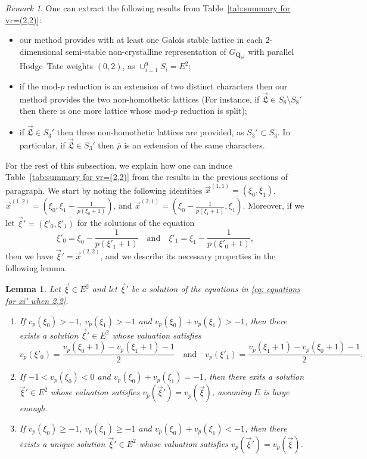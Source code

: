\documentclass[11pt]{amsart}
\theoremstyle{definition}
\numberwithin{equation}{subsection}
\theoremstyle{plain}
\theoremstyle{plain}
\theoremstyle{plain}
\theoremstyle{plain}
\theoremstyle{plain}
\theoremstyle{plain}
\theoremstyle{plain}
\theoremstyle{plain}
\theoremstyle{plain}
\newtheorem{lemm}[equation]{Lemma}
\theoremstyle{plain}
\theoremstyle{plain}
\theoremstyle{plain}
\theoremstyle{definition}
\theoremstyle{definition}
\theoremstyle{definition}
\theoremstyle{remark}
\newtheorem{rema}[equation]{Remark}
\renewcommand{\(}{\textup{(}}
\renewcommand{\)}{\textup{)}}
\newcommand{\Q}{\mathbf{Q}}
\newcommand{\rhobar}{\overline{\rho}}
\newcommand{\fL}{\mathfrak{L}}
\newcommand{\vx}{\vec{x}}
\newcommand{\vL}{\vec{\fL}}
\begin{document}
\begin{rema}\label{rema: 2,2}
One can extract the following results from Table~\ref{tab:summary for vr=(2,2)}:
\begin{itemize}[leftmargin=*]
\item our method provides with at least one Galois stable lattice in each $2$-dimensional semi-stable non-crystalline representation of $G_{\Q_{p^2}}$ with parallel Hodge--Tate weights $(0,2)$, as $\cup_{i=1}^9S_i=E^2$;
\item if the mod-$p$ reduction is an extension of two distinct characters then our method provides the two non-homothetic lattices (For instance, if $\vL\in S_8\setminus S_8'$ then there is one more lattice whose mod-$p$ reduction is split);
\item if $\vL\in S_3'$ then three non-homothetic lattices are provided, as $S_3'\subset S_3$. In particular, if $\vL\in S_3'$ then $\rhobar$ is an extension of the same characters.
\end{itemize}
\end{rema}

For the rest of this subsection, we explain how one can induce Table~\ref{tab:summary for vr=(2,2)} from the results in the previous sections of paragraph.
We start by noting the following identities $\vx^{(1,1)}=(\xi_0,\xi_1)$, $\vx^{(1,2)}=(\xi_0,\xi_1-\frac{1}{p(\xi_0+1)})$, and $\vx^{(2,1)}=(\xi_0-\frac{1}{p(\xi_1+1)},\xi_1)$. Moreover, if we let $\vec{\xi}'=(\xi'_0,\xi'_1)$ for the solutions of the equation
\begin{equation}\label{eq: equations for xi' when 2,2}
\xi'_0=\xi_0-\frac{1}{p(\xi'_1+1)}
\quad\mbox{and}\quad
\xi'_1=\xi_1-\frac{1}{p(\xi'_0+1)},
\end{equation}
then we have $\vec{\xi}'=\vx^{(2,2)}$, and we describe its necessary properties in the following lemma.
\begin{lemm}\label{lemma: implicit vx^(2,2)}
Let $\vec{\xi}\in E^2$ and let $\vec{\xi}'$ be a solution of the equations in \eqref{eq: equations for xi' when 2,2}.
\begin{enumerate}[leftmargin=*]
\item If $v_p(\xi_0)>-1$, $v_p(\xi_1)>-1$ and $v_p(\xi_0)+v_p(\xi_1)>-1$, then there exists a solution $\vec{\xi}'\in E^2$ whose valuation satisfies
$$v_p(\xi'_0)=\frac{v_p(\xi_0+1)-v_p(\xi_1+1)-1}{2}
\quad\mbox{and}\quad
v_p(\xi'_1)=\frac{v_p(\xi_1+1)-v_p(\xi_0+1)-1}{2}.$$
\item If $-1<v_p(\xi_0)<0$ and $v_p(\xi_0)+v_p(\xi_1)=-1$, then there exits a solution $\vec{\xi}'\in E^2$ whose valuation satisfies $v_p(\vec{\xi}')=v_p(\vec{\xi})$, assuming $E$ is large enough.
\item If $v_p(\xi_0)\geq -1$, $v_p(\xi_1)\geq -1$ and $v_p(\xi_0)+v_p(\xi_1)<-1$, then there exists a unique solution $\vec{\xi}'\in E^2$ whose valuation satisfies $v_p(\vec{\xi}')=v_p(\vec{\xi})$.
\end{enumerate}
\end{lemm}
\end{document}

